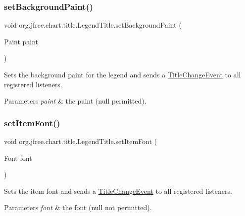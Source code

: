 \subsubsection{\texorpdfstring{set\+Background\+Paint()}{setBackgroundPaint()}}
{\footnotesize\ttfamily void org.\+jfree.\+chart.\+title.\+Legend\+Title.\+set\+Background\+Paint (\begin{DoxyParamCaption}\item[{Paint}]{paint }\end{DoxyParamCaption})}

Sets the background paint for the legend and sends a \mbox{\hyperlink{}{Title\+Change\+Event}} to all registered listeners.


\begin{DoxyParams}{Parameters}
{\em paint} & the paint ({\ttfamily null} permitted). \\
\hline
\end{DoxyParams}
\mbox{\label{classorg_1_1jfree_1_1chart_1_1title_1_1_legend_title_a696e75d03f7fe2a814b454710a0fe4af}} 
\subsubsection{\texorpdfstring{set\+Item\+Font()}{setItemFont()}}
{\footnotesize\ttfamily void org.\+jfree.\+chart.\+title.\+Legend\+Title.\+set\+Item\+Font (\begin{DoxyParamCaption}\item[{Font}]{font }\end{DoxyParamCaption})}

Sets the item font and sends a \mbox{\hyperlink{}{Title\+Change\+Event}} to all registered listeners.


\begin{DoxyParams}{Parameters}
{\em font} & the font ({\ttfamily null} not permitted). \\
\hline
\end{DoxyParams}
\mbox{\label{classorg_1_1jfree_1_1chart_1_1title_1_1_legend_title_abbaecf02a0152b5f92dbc5b0ccfa3c53}} 
